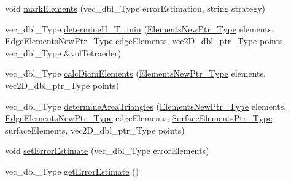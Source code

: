 \begin{DoxyCompactItemize}
\item 
void \hyperlink{classFEDD_1_1ErrorEstimation_aa2879f12185d2ce263ebefb262e60537}{mark\+Elements} (vec\+\_\+dbl\+\_\+\+Type error\+Estimation, string strategy)
\item 
vec\+\_\+dbl\+\_\+\+Type \hyperlink{classFEDD_1_1ErrorEstimation_a45bbf7b54fcdf403d3a9b273ac08fb9f}{determine\+H\+\_\+\+T\+\_\+min} (\hyperlink{classFEDD_1_1ErrorEstimation_a524b367a9af6f2c128a7a7ae27d74535}{Elements\+New\+Ptr\+\_\+\+Type} elements, \hyperlink{classFEDD_1_1ErrorEstimation_ad3347e220a355c8edda97dd2805bf7ff}{Edge\+Elements\+New\+Ptr\+\_\+\+Type} edge\+Elements, vec2\+D\+\_\+dbl\+\_\+ptr\+\_\+\+Type points, vec\+\_\+dbl\+\_\+\+Type \&vol\+Tetraeder)
\item 
vec\+\_\+dbl\+\_\+\+Type \hyperlink{classFEDD_1_1ErrorEstimation_a83f3191de2d2aa74ad72ddd5e5fab104}{calc\+Diam\+Elements} (\hyperlink{classFEDD_1_1ErrorEstimation_a524b367a9af6f2c128a7a7ae27d74535}{Elements\+New\+Ptr\+\_\+\+Type} elements, vec2\+D\+\_\+dbl\+\_\+ptr\+\_\+\+Type points)
\item 
vec\+\_\+dbl\+\_\+\+Type \hyperlink{classFEDD_1_1ErrorEstimation_a9aebe8e8839d9e2eba7eab3abf68b801}{determine\+Area\+Triangles} (\hyperlink{classFEDD_1_1ErrorEstimation_a524b367a9af6f2c128a7a7ae27d74535}{Elements\+New\+Ptr\+\_\+\+Type} elements, \hyperlink{classFEDD_1_1ErrorEstimation_ad3347e220a355c8edda97dd2805bf7ff}{Edge\+Elements\+New\+Ptr\+\_\+\+Type} edge\+Elements, \hyperlink{classFEDD_1_1ErrorEstimation_a391a95553efe67657e031e1af4ec02cc}{Surface\+Elements\+Ptr\+\_\+\+Type} surface\+Elements, vec2\+D\+\_\+dbl\+\_\+ptr\+\_\+\+Type points)
\item 
void \hyperlink{classFEDD_1_1ErrorEstimation_a9e2db66d1ec69da791d2facdcb1ccaf9}{set\+Error\+Estimate} (vec\+\_\+dbl\+\_\+\+Type error\+Elements)
\item 
vec\+\_\+dbl\+\_\+\+Type \hyperlink{classFEDD_1_1ErrorEstimation_ab0a11eb997d7d6d78ef316dba8268905}{get\+Error\+Estimate} ()
\end{DoxyCompactItemize}
